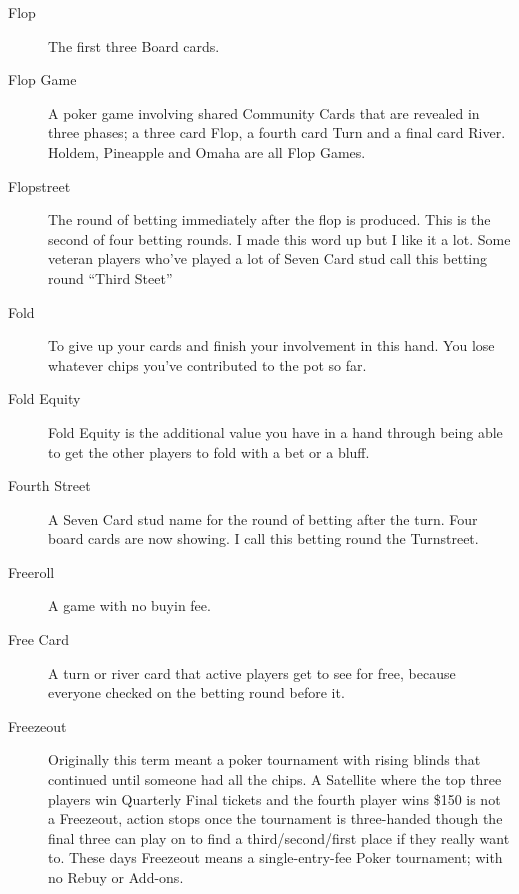 \begin{description}
\item[Flop] The first three Board cards.

\item[Flop Game] A poker game involving shared Community Cards that
are revealed in three phases; a three card Flop, a fourth card Turn
and a final card River. Holdem, Pineapple and Omaha are all Flop
Games.

\item[Flopstreet] The round of betting immediately after the flop is
produced. This is the second of four betting rounds. I made this word
up but I like it a lot. Some veteran players who've played a lot of
Seven Card stud call this betting round ``Third Steet''

\item[Fold] To give up your cards and finish your involvement in this
hand. You lose whatever chips you've contributed to the pot so far.

\item[Fold Equity] Fold Equity is the additional value you have in a
hand through being able to get the other players to fold with a bet or
a bluff.

\item[Fourth Street] A Seven Card stud name for the round of betting
after the turn. Four board cards are now showing. I call this betting
round the Turnstreet.

\item[Freeroll] A game with no buyin fee.

\item[Free Card] A turn or river card that active players get to see
for free, because everyone checked on the betting round before it.

\item[Freezeout] Originally this term meant a poker tournament with
rising blinds that continued until someone had all the chips. A
Satellite where the top three players win Quarterly Final tickets and
the fourth player wins \$150 is not a Freezeout, action stops once the
tournament is three-handed though the final three can play on to find
a third/second/first place if they really want to. These days
Freezeout means a single-entry-fee Poker tournament; with no Rebuy or
Add-ons.



\end{description}

